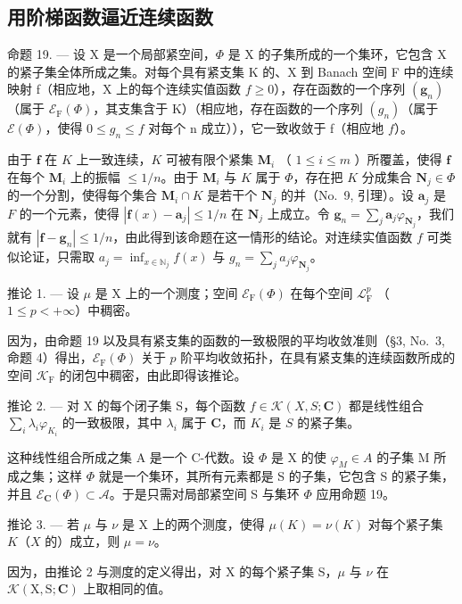 \subsection{用阶梯函数逼近连续函数}

命题 19. --- 设 X 是一个局部紧空间，\(\Phi\) 是 X 的子集所成的一个集环，它包含 X 的紧子集全体所成之集。对每个具有紧支集 K 的、X 到 Banach 空间 F 中的连续映射 f（相应地，X 上的每个连续实值函数 \(f \geqslant 0\)），存在函数的一个序列 \((\mathbf{g}_n)\)（属于 \(\mathcal{E}_{\mathrm{F}}(\Phi)\)，其支集含于 K）（相应地，存在函数的一个序列 \((g_n)\)（属于 \(\mathcal{E}(\Phi)\)，使得 \(0 \leqslant g_n \leqslant f\) 对每个 n 成立）），它一致收敛于 f（相应地 \(f\)）。

由于 \(\mathbf{f}\) 在 \(K\) 上一致连续，\(K\) 可被有限个紧集 \(\mathbf{M}_i\) （ \(1 \leqslant i \leqslant m\) ）所覆盖，使得 \(\mathbf{f}\) 在每个 \(\mathbf{M}_i\) 上的振幅 \(\leqslant 1/n\)。由于 \(\mathbf{M}_i\) 与 \(K\) 属于 \(\Phi\)，存在把 \(K\) 分成集合 \(\mathbf{N}_j \in \Phi\) 的一个分割，使得每个集合 \(\mathbf{M}_i \cap K\) 是若干个 \(\mathbf{N}_j\) 的并（No.~9, 引理）。设 \(\mathbf{a}_j\) 是 \(F\) 的一个元素，使得 \(|\mathbf{f}(x) - \mathbf{a}_j| \leqslant 1/n\) 在 \(\mathbf{N}_j\) 上成立。令 \(\mathbf{g}_n = \sum_j \mathbf{a}_j \varphi_{\mathbf{N}_j}\)，我们就有 \(|\mathbf{f} - \mathbf{g}_n| \leqslant 1/n\)，由此得到该命题在这一情形的结论。对连续实值函数 \(f\) 可类似论证，只需取 \(a_j = \inf_{x \in \mathbb{N}_j} f(x)\) 与 \(g_n = \sum_j a_j \varphi_{\mathbf{N}_j}\)。

推论 1. --- 设 \(\mu\) 是 X 上的一个测度；空间 \(\mathcal{E}_{\mathrm{F}}(\Phi)\) 在每个空间 \(\mathcal{L}_{\mathrm{F}}^{p}\) （ \(1 \leqslant p < +\infty\)）中稠密。

因为，由命题 19 以及具有紧支集的函数的一致极限的平均收敛准则（§3, No.~3, 命题 4）得出，\(\mathcal{E}_{\mathrm{F}}(\Phi)\) 关于 \(p\) 阶平均收敛拓扑，在具有紧支集的连续函数所成的空间 \(\mathcal{K}_{\mathrm{F}}\) 的闭包中稠密，由此即得该推论。

推论 2. --- 对 X 的每个闭子集 S，每个函数 \(f \in \mathcal{K}(X, S; \mathbf{C})\) 都是线性组合 \(\sum_{i} \lambda_i \varphi_{K_i}\) 的一致极限，其中 \(\lambda_i\) 属于 \(\mathbf{C}\)，而 \(K_i\) 是 \(S\) 的紧子集。

这种线性组合所成之集 A 是一个 C-代数。设 \(\Phi\) 是 X 的使 \(\varphi_{M} \in A\) 的子集 M 所成之集；这样 \(\Phi\) 就是一个集环，其所有元素都是 S 的子集，它包含 S 的紧子集，并且 \(\mathcal{E}_{\mathbf{C}}(\Phi) \subset \mathcal{A}\)。于是只需对局部紧空间 S 与集环 \(\Phi\) 应用命题 19。

推论 3. --- 若 \(\mu\) 与 \(\nu\) 是 X 上的两个测度，使得 \(\mu(K) = \nu(K)\) 对每个紧子集 \(K\)（\(X\) 的）成立，则 \(\mu = \nu\)。

因为，由推论 2 与测度的定义得出，对 X 的每个紧子集 S，\(\mu\) 与 \(\nu\) 在 \(\mathcal{K}(\mathrm{X},\mathrm{S};\mathbf{C})\) 上取相同的值。

